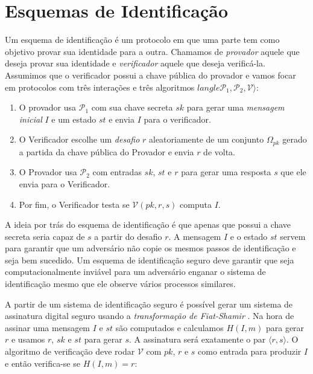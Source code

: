 \section{Esquemas de Identificação}
\label{sec:esqu-de-ident}

Um esquema de identificação é um protocolo em que uma parte tem como objetivo provar sua identidade para a outra.
Chamamos de {\em provador} aquele que deseja provar sua identidade e {\em verificador} aquele que deseja verificá-la.
Assumimos que o verificador possui a chave pública do provador e vamos focar em protocolos com três interações e três algoritmos $langle \mathcal{P}_1, \mathcal{P}_2, \mathcal{V} \rangle$:
\begin{enumerate}
\item O provador usa $\mathcal{P}_1$ com sua chave secreta $sk$ para gerar uma {\em mensagem inicial} $I$ e um estado $st$ e envia $I$ para o verificador.
\item O Verificador escolhe um {\em desafio} $r$ aleatoriamente de um conjunto $\Omega_{pk}$ gerado a partida da chave pública do Provador e envia $r$  de volta.
\item O Provador usa $\mathcal{P}_2$ com entradas $sk$, $st$ e $r$ para gerar uma resposta $s$ que ele envia para o Verificador.
\item Por fim, o Verificador testa se $\mathcal{V}(pk, r, s)$ computa $I$.
\end{enumerate}


A ideia por trás do esquema de identificação é que apenas que possui a chave secreta seria capaz de $s$ a partir do desafio $r$.
A mensagem $I$ e o estado $st$ servem para garantir que um adversário não copie os mesmos passos de identificação e seja bem sucedido.
Um esquema de identificação seguro deve garantir que seja computacionalmente inviável para um adversário enganar o sistema de identificação mesmo que ele observe vários processos similares.

A partir de um sistema de identificação seguro é possível gerar um sistema de assinatura digital seguro usando a {\em transformação de Fiat-Shamir} \cite{Fiat87}.
Na hora de assinar uma mensagem $I$ e $st$ são computados e calculamos $H(I, m)$ para gerar $r$ e usamos $r$, $sk$ e $st$ para gerar $s$.
A assinatura será exatamente o par $\langle r, s \rangle$.
O algoritmo de verificação deve rodar $\mathcal{V}$ com $pk$, $r$ e $s$ como entrada para produzir $I$ e então verifica-se se $H(I, m) = r$: 

